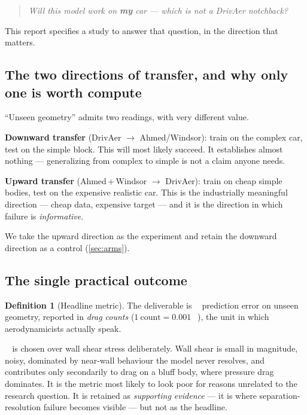 \documentclass[10pt,a4paper]{article}
\theoremstyle{definition}
\newtheorem{definition}{Definition}[section]
\DeclareMathOperator{\Cd}{C_d}
\begin{document}
\begin{quote}
\emph{Will this model work on \textbf{my} car --- which is not a DrivAer
notchback?}
\end{quote}

This report specifies a study to answer that question, in the direction that
matters.

\subsection{The two directions of transfer, and why only one is worth compute}

``Unseen geometry'' admits two readings, with very different value.

\textbf{Downward transfer} (DrivAer $\to$ Ahmed/Windsor): train on the complex
car, test on the simple block. This will most likely succeed. It establishes
almost nothing --- generalizing from complex to simple is not a claim anyone
needs.

\textbf{Upward transfer} (Ahmed\,+\,Windsor $\to$ DrivAer): train on cheap simple
bodies, test on the expensive realistic car. This is the industrially meaningful
direction --- cheap data, expensive target --- and it is the direction in which
failure is \emph{informative}.

We take the upward direction as the experiment and retain the downward direction
as a control (\cref{sec:arms}).

\subsection{The single practical outcome}

\begin{definition}[Headline metric]
\label{def:headline}
The deliverable is $\Cd$ prediction error on unseen geometry, reported in
\emph{drag counts} ($1\ \text{count} = 0.001\ \Cd$), the unit in which
aerodynamicists actually speak.
\end{definition}

$\Cd$ is chosen over wall shear stress deliberately. Wall shear is small in
magnitude, noisy, dominated by near-wall behaviour the model never resolves, and
contributes only secondarily to drag on a bluff body, where pressure drag
dominates. It is the metric most likely to look poor for reasons unrelated to
the research question. It is retained as \emph{supporting evidence} --- it is
where separation-resolution failure becomes visible --- but not as the headline.
\end{document}

